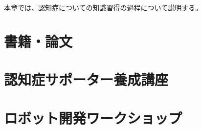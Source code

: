 \documentclass[../report]{subfiles}
\begin{document}
本章では、認知症についての知識習得の過程について説明する。
\bunseki{}

\section{書籍・論文}
\bunseki{}

\section{認知症サポーター養成講座}
\bunseki{}

\section{ロボット開発ワークショップ}
\bunseki{}
\end{document}
